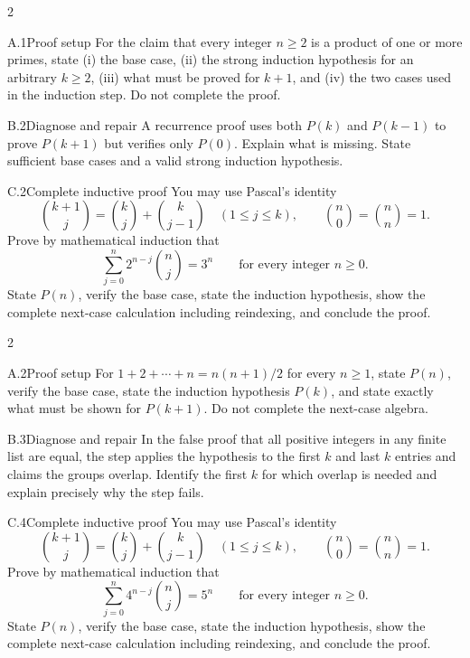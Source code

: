\documentclass[9pt]{extarticle}
\begin{document}
\CoreWorkArea
\FormBreak
{}
\begin{multicols}{2}
\begin{CompactCoreProblem}{A.1}{Proof setup}
For the claim that every integer $n\ge2$ is a product of one or more primes, state (i) the base case, (ii) the strong induction hypothesis for an arbitrary $k\ge2$, (iii) what must be proved for $k+1$, and (iv) the two cases used in the induction step. Do not complete the proof.
\end{CompactCoreProblem}
\begin{CompactCoreProblem}{B.2}{Diagnose and repair}
A recurrence proof uses both $P(k)$ and $P(k-1)$ to prove $P(k+1)$ but verifies only $P(0)$. Explain what is missing. State sufficient base cases and a valid strong induction hypothesis.
\end{CompactCoreProblem}
\end{multicols}
\begin{CompactCoreProblem}{C.2}{Complete inductive proof}
You may use Pascal's identity
\[
\binom{k+1}{j}=\binom{k}{j}+\binom{k}{j-1}
\quad(1\le j\le k),\qquad
\binom{n}{0}=\binom{n}{n}=1.
\]
Prove by mathematical induction that
\[
\sum_{j=0}^{n} 2^{n-j}\binom{n}{j}=3^n\qquad\text{for every integer }n\ge0.
\]
State $P(n)$, verify the base case, state the induction hypothesis, show the complete next-case calculation including reindexing, and conclude the proof.
\end{CompactCoreProblem}
\CoreWorkArea
\FormBreak
{}
\begin{multicols}{2}
\begin{CompactCoreProblem}{A.2}{Proof setup}
For $1+2+\cdots+n=n(n+1)/2$ for every $n\ge1$, state $P(n)$, verify the base case, state the induction hypothesis $P(k)$, and state exactly what must be shown for $P(k+1)$. Do not complete the next-case algebra.
\end{CompactCoreProblem}
\begin{CompactCoreProblem}{B.3}{Diagnose and repair}
In the false proof that all positive integers in any finite list are equal, the step applies the hypothesis to the first $k$ and last $k$ entries and claims the groups overlap. Identify the first $k$ for which overlap is needed and explain precisely why the step fails.
\end{CompactCoreProblem}
\end{multicols}
\begin{CompactCoreProblem}{C.4}{Complete inductive proof}
You may use Pascal's identity
\[
\binom{k+1}{j}=\binom{k}{j}+\binom{k}{j-1}
\quad(1\le j\le k),\qquad
\binom{n}{0}=\binom{n}{n}=1.
\]
Prove by mathematical induction that
\[
\sum_{j=0}^{n} 4^{n-j}\binom{n}{j}=5^n\qquad\text{for every integer }n\ge0.
\]
State $P(n)$, verify the base case, state the induction hypothesis, show the complete next-case calculation including reindexing, and conclude the proof.
\end{CompactCoreProblem}
\end{document}
